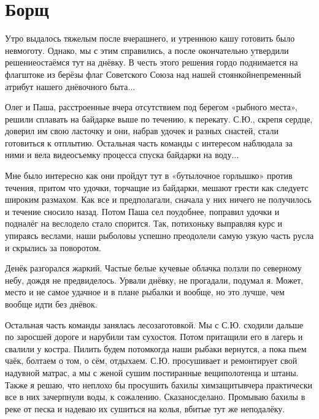 \chapter{Борщ} 

Утро выдалось тяжелым после вчерашнего, и утреннюю кашу готовить было невмоготу. Однако, мы с этим справились, а после окончательно утвердили решение\mdash остаёмся тут на днёвку. В честь этого решения гордо поднимается на флагштоке из берёзы флаг Советского Союза над нашей стоянкой\mdash непременный атрибут нашего днёвочного быта$\ldots$ 

Олег и Паша, расстроенные вчера отсутствием под берегом «рыбного места», решили сплавать на байдарке выше по течению, к перекату. С.Ю., скрепя сердце, доверил им свою ласточку и они, набрав удочек и разных снастей, стали готовиться к отплытию. Остальная часть команды с интересом наблюдала за ними и вела видеосъемку процесса спуска байдарки на воду$\ldots$
 
Мне было интересно как они пройдут тут в «бутылочное горлышко» против течения, притом что удочки, торчащие из байдарки, мешают грести как следует\mdash с широким размахом. Как все и предполагали, сначала у них ничего не получилось и течение сносило назад. Потом Паша сел поудобнее, поправил удочки и подналёг на весло\mdash дело стало спорится. Так, потихоньку выправляя курс и упираясь веслами, наши рыболовы успешно преодолели самую узкую часть русла и скрылись за поворотом.

Денёк разгорался жаркий. Частые белые кучевые облачка ползли по северному небу, дождя не предвиделось. Урвали днёвку, не прогадали, подумал я. Может, место и не самое удачное и в плане рыбалки и вообще, но это лучше, чем вообще идти без днёвок.

Остальная часть команды занялась лесозаготовкой. Мы с С.Ю. сходили дальше по заросшей дороге и нарубили там сухостоя. Потом притащили его в лагерь и свалили у костра. Пилить будем потом\mdash когда наши рыбаки вернутся, а пока пьем чаёк, болтаем о том, о сём, отдыхаем. С.Ю. просушивает и ремонтирует свой надувной матрас, а мы с женой сушим постиранные вещи\mdash полотенца и штаны. Также я решаю, что неплохо бы просушить бахилы химзащиты\mdash вчера практически все в них зачерпнули воды, к сожалению. Сказано\mdash сделано. Промываю бахилы в реке от песка и надеваю их сушиться на колья, вбитые тут же неподалёку. 

